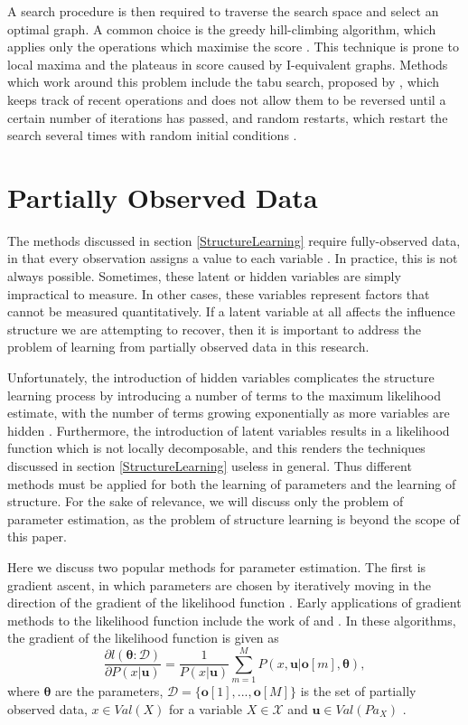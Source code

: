 \documentclass [11pt]{article}
\begin{document}
A search procedure is then required to traverse the search space and select an optimal graph. A common choice is the greedy hill-climbing algorithm, which applies only the operations which maximise the score \citep{koller09}. This technique is prone to local maxima and the plateaus in score caused by I-equivalent graphs. Methods which work around this problem include the tabu search, proposed by \citet{glover86}, which keeps track of recent operations and does not allow them to be reversed until a certain number of iterations has passed, and random restarts, which restart the search several times with random initial conditions \citep{koller09}.
\section{Partially Observed Data}\label{PartiallyObservedData}
The methods discussed in section \ref{StructureLearning} require fully-observed data, in that every observation assigns a value to each variable \citep{koller09}. In practice, this is not always possible. Sometimes, these latent or hidden variables are simply impractical to measure. In other cases, these variables represent factors that cannot be measured quantitatively. If a latent variable at all affects the influence structure we are attempting to recover, then it is important to address the problem of learning from partially observed data in this research.

Unfortunately, the introduction of hidden variables complicates the structure learning process by introducing a number of terms to the maximum likelihood estimate, with the number of terms growing exponentially as more variables are hidden \citep{koller09}. Furthermore, the introduction of latent variables results in a likelihood function which is not locally decomposable, and this renders the techniques discussed in section \ref{StructureLearning} useless in general. Thus different methods must be applied for both the learning of parameters and the learning of structure. For the sake of relevance, we will discuss only the problem of parameter estimation, as the problem of structure learning is beyond the scope of this paper.

Here we discuss two popular methods for parameter estimation. The first is gradient ascent, in which parameters are chosen by iteratively moving in the direction of the gradient of the likelihood function \citep{koller09}. Early applications of gradient methods to the likelihood function include the work of \cite{thiesson95} and \cite{binder97}. In these algorithms, the gradient of the likelihood function is given as
\begin{equation*}
\frac{\partial l(\boldsymbol{\theta}:\mathcal{D})}{\partial P(x|\boldsymbol{u})} = \frac{1}{P(x|\boldsymbol{u})}\sum_{m=1}^{M}P(x,\boldsymbol{u}|\boldsymbol{o}[m],\boldsymbol{\theta}),
\end{equation*}
where $\boldsymbol{\theta}$ are the parameters, $\mathcal{D} = \{\boldsymbol{o}[1],...,\boldsymbol{o}[M]\}$ is the set of partially observed data, $x \in Val(X)$ for a variable $X \in \mathcal{X}$ and $\boldsymbol{u} \in Val(Pa_{X})$ \citep{koller09}.
\end{document}
